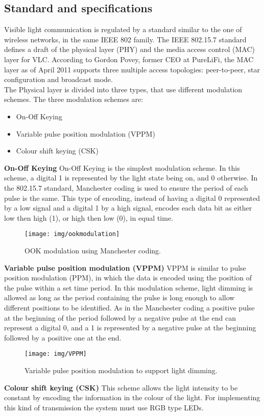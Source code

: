 \subsection{Standard and specifications}
\label{modulschemes}
Visible light communication is regulated by a standard similar to the one of wireless networks, in the same IEEE 802 family.\cite{IEEE}
The IEEE 802.15.7 standard defines a draft of the physical layer (PHY) and the media access control (MAC) layer for VLC. 
According to Gordon Povey, former CEO at PureLiFi\cite{poveyspec}, the MAC layer as of April 2011 supports three multiple access topologies: peer-to-peer, star configuration and broadcast mode.\\
The Physical layer is divided into three types, that use different modulation schemes.
The three modulation schemes are: 
\begin{itemize}
\item On-Off Keying
\item Variable pulse position modulation (VPPM)
\item Colour shift keying (CSK)
\end{itemize}
\textbf{On-Off Keying}\newline
On-Off Keying is the simplest modulation scheme. 
In this scheme, a digital 1 is represented by the light state being on, and 0 otherwise.
In the 802.15.7 standard, Manchester coding is used to ensure the period of each pulse is the same.
This type of encoding, instead of having a digital 0 represented by a low signal and a digital 1 by a high signal, encodes each data bit as either low then high (1), or high then low (0), in equal time.\\
\newline
\begin{figure}[H]
\centering
\texttt{[image: img/ookmodulation]}
\caption{OOK modulation using Manchester coding.}
\label{fig:ookmod}
\end{figure}
\textbf{Variable pulse position modulation (VPPM)}\newline
VPPM is similar to pulse position modulation (PPM), in which the data is encoded using the position of the pulse within a set time period.
In this modulation scheme, light dimming is allowed as long as the period containing the pulse is long enough to allow different positions to be identified. 
As in the Manchester coding a positive pulse at the beginning of the period followed by a negative pulse at the end can represent a digital 0, and a 1 is represented by a negative pulse at the beginning followed by a positive one at the end.\\
\newline
\begin{figure}[H]
\centering
\texttt{[image: img/VPPM]}
\caption{Variable pulse position modulation to support light dimming.}
\label{fig:ookmod}
\end{figure}
\textbf{Colour shift keying (CSK)}\newline
This scheme allows the light intensity to be constant by encoding the information in the colour of the light.
For implementing this kind of transmission the system must use RGB type LEDs.